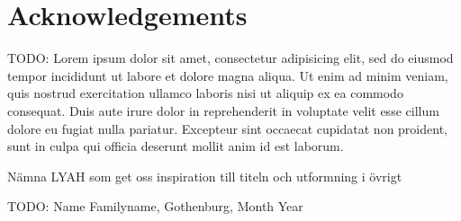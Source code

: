 \thispagestyle{plain}			%
\section*{Acknowledgements}
TODO: Lorem ipsum dolor sit amet, consectetur adipisicing elit, sed do eiusmod tempor incididunt ut labore et dolore magna aliqua. Ut enim ad minim veniam, quis nostrud exercitation ullamco laboris nisi ut aliquip ex ea commodo consequat. Duis aute irure dolor in reprehenderit in voluptate velit esse cillum dolore eu fugiat nulla pariatur. Excepteur sint occaecat cupidatat non proident, sunt in culpa qui officia deserunt mollit anim id est laborum.

Nämna LYAH som get oss inspiration till titeln och utformning i övrigt

\vspace{1.5cm}
\hfill
TODO: Name Familyname, Gothenburg, Month Year

\newpage				%
\thispagestyle{empty}
\mbox{}